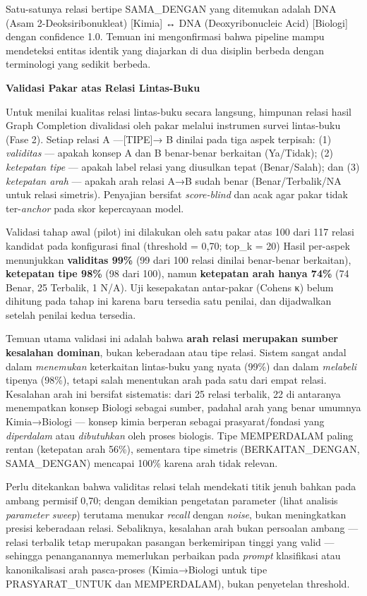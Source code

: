 \documentclass[
]{article}
\begin{document}
Satu-satunya relasi bertipe SAMA\_DENGAN yang ditemukan adalah DNA (Asam
2-Deoksiribonukleat) {[}Kimia{]} ↔ DNA (Deoxyribonucleic Acid)
{[}Biologi{]} dengan confidence 1.0. Temuan ini mengonfirmasi bahwa
pipeline mampu mendeteksi entitas identik yang diajarkan di dua disiplin
berbeda dengan terminologi yang sedikit berbeda.

\textbf{Validasi Pakar atas Relasi Lintas-Buku}

Untuk menilai kualitas relasi lintas-buku secara langsung, himpunan
relasi hasil Graph Completion divalidasi oleh pakar melalui instrumen
survei lintas-buku (Fase 2). Setiap relasi A ---{[}TIPE{]}→ B dinilai
pada tiga aspek terpisah: (1) \emph{validitas} --- apakah konsep A dan B
benar-benar berkaitan (Ya/Tidak); (2) \emph{ketepatan tipe} --- apakah
label relasi yang diusulkan tepat (Benar/Salah); dan (3) \emph{ketepatan
arah} --- apakah arah relasi A→B sudah benar (Benar/Terbalik/NA untuk
relasi simetris). Penyajian bersifat \emph{score-blind} dan acak agar
pakar tidak ter-\emph{anchor} pada skor kepercayaan model.

Validasi tahap awal (pilot) ini dilakukan oleh satu pakar atas 100 dari
117 relasi kandidat pada konfigurasi final (threshold = 0,70; top\_k =
20) Hasil per-aspek menunjukkan \textbf{validitas 99\%} (99 dari 100
relasi dinilai benar-benar berkaitan), \textbf{ketepatan tipe 98\%} (98
dari 100), namun \textbf{ketepatan arah hanya 74\%} (74 Benar, 25
Terbalik, 1 N/A). Uji kesepakatan antar-pakar (Cohen\textquotesingle s
κ) belum dihitung pada tahap ini karena baru tersedia satu penilai, dan
dijadwalkan setelah penilai kedua tersedia.

Temuan utama validasi ini adalah bahwa \textbf{arah relasi merupakan
sumber kesalahan dominan}, bukan keberadaan atau tipe relasi. Sistem
sangat andal dalam \emph{menemukan} keterkaitan lintas-buku yang nyata
(99\%) dan dalam \emph{melabeli} tipenya (98\%), tetapi salah menentukan
arah pada satu dari empat relasi. Kesalahan arah ini bersifat
sistematis: dari 25 relasi terbalik, 22 di antaranya menempatkan konsep
Biologi sebagai sumber, padahal arah yang benar umumnya Kimia→Biologi
--- konsep kimia berperan sebagai prasyarat/fondasi yang
\emph{diperdalam} atau \emph{dibutuhkan} oleh proses biologis. Tipe
MEMPERDALAM paling rentan (ketepatan arah 56\%), sementara tipe simetris
(BERKAITAN\_DENGAN, SAMA\_DENGAN) mencapai 100\% karena arah tidak
relevan.

Perlu ditekankan bahwa validitas relasi telah mendekati titik jenuh
bahkan pada ambang permisif 0,70; dengan demikian pengetatan parameter
(lihat analisis \emph{parameter sweep}) terutama menukar \emph{recall}
dengan \emph{noise}, bukan meningkatkan presisi keberadaan relasi.
Sebaliknya, kesalahan arah bukan persoalan ambang --- relasi terbalik
tetap merupakan pasangan berkemiripan tinggi yang valid --- sehingga
penanganannya memerlukan perbaikan pada \emph{prompt} klasifikasi atau
kanonikalisasi arah pasca-proses (Kimia→Biologi untuk tipe
PRASYARAT\_UNTUK dan MEMPERDALAM), bukan penyetelan threshold.
\end{document}
